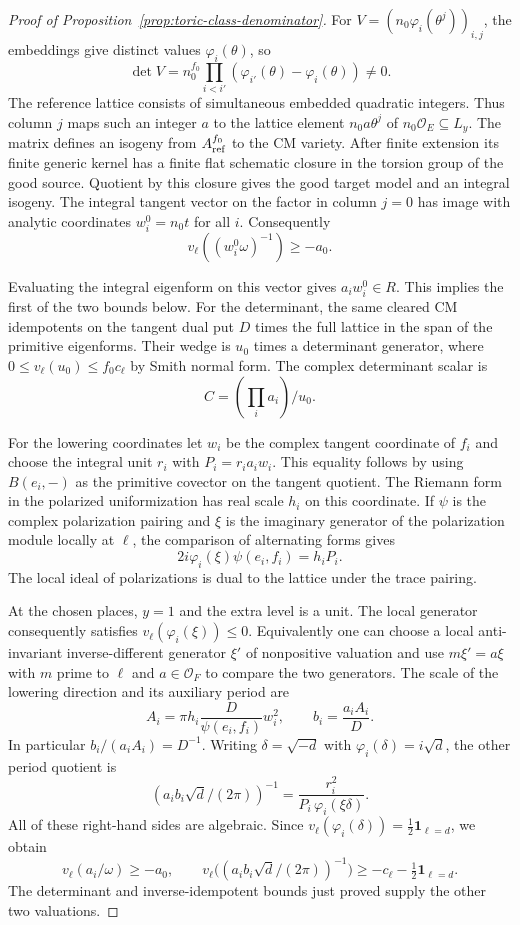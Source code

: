 \begin{proof}[Proof of Proposition~\ref{prop:toric-class-denominator}]
For \(V=(n_0\varphi_i(\theta^j))_{i,j}\), the embeddings
give distinct values \(\varphi_i(\theta)\), so
\[
 \det V=n_0^{f_0}\prod_{i<i'}
               (\varphi_{i'}(\theta)-\varphi_i(\theta))\ne0 .
\]
The reference lattice consists of simultaneous embedded
quadratic integers. Thus column \(j\) maps such an
integer \(a\) to the lattice element \(n_0a\theta^j\)
of \(n_0\mathcal O_E\subseteq L_y\). The matrix defines an
isogeny from \(A_{\rm ref}^{f_0}\) to the CM variety.
After finite extension its finite generic kernel has
a finite flat schematic closure in the torsion group
of the good source. Quotient by this closure gives
the good target model and an integral isogeny.
The integral tangent vector on the factor in column
\(j=0\) has image with analytic coordinates
\(w_i^0=n_0t\) for all \(i\). Consequently
\[
 v_\ell((w_i^0\omega)^{-1})\ge-a_0.
\]

Evaluating the integral eigenform on this vector
gives \(a_iw_i^0\in R\). This implies the first
of the two bounds below. For the determinant,
the same cleared CM idempotents on the tangent
dual put \(D\) times the full lattice in the span
of the primitive eigenforms. Their wedge is
\(u_0\) times a determinant generator, where
\(0\le v_\ell(u_0)\le f_0c_\ell\) by Smith normal
form. The complex determinant scalar is
\[
 C=(\prod_i a_i)/u_0.
\]


For the lowering coordinates let \(w_i\) be the
complex tangent coordinate of \(f_i\) and choose
the integral unit \(r_i\) with \(P_i=r_i a_i w_i\).
This equality follows by using \(B(e_i,-)\) as
the primitive covector on the tangent quotient.
The Riemann form in the polarized uniformization
has real scale \(h_i\) on this coordinate.
If \(\psi\) is the complex polarization pairing
and \(\xi\) is the imaginary generator of the
polarization module locally at \(\ell\), the
comparison of alternating forms gives
\[
  2i\varphi_i(\xi)\psi(e_i,f_i)=h_i P_i .
\]
The local ideal of polarizations is dual to the
lattice under the trace pairing.

At the chosen
places, \(y=1\) and the extra level is a unit.
The local generator consequently satisfies
\(v_\ell(\varphi_i(\xi))\le0\).
Equivalently one can choose a local anti-invariant
inverse-different generator \(\xi'\) of nonpositive
valuation and use
\(m\xi'=a\xi\) with \(m\) prime to \(\ell\)
and \(a\in\mathcal O_F\) to compare the two generators.
The scale of the lowering direction and its auxiliary
period are
\[
  A_i=\pi h_i\frac{D}{\psi(e_i,f_i)}w_i^2,\qquad
  b_i=\frac{a_i A_i}{D}.
\]
In particular \(b_i/(a_i A_i)=D^{-1}\). Writing
\(\delta=\sqrt{-d}\) with \(\varphi_i(\delta)=i\sqrt d\),
the other period quotient is
\[
   (a_i b_i\sqrt d/(2\pi))^{-1}
       =\frac{r_i^2}{P_i\,\varphi_i(\xi\delta)} .
\]
All of these right-hand sides are algebraic.
Since \(v_\ell(\varphi_i(\delta))=\frac12\mathbf1_{\ell=d}\),
we obtain
\[
 v_\ell(a_i/\omega)\ge-a_0,\qquad
 v_\ell\bigl((a_i b_i\sqrt d/(2\pi))^{-1}\bigr)
     \ge-c_\ell-\tfrac12\mathbf1_{\ell=d}.
\]
The determinant and inverse-idempotent bounds just
proved supply the other two valuations.


\end{proof}
